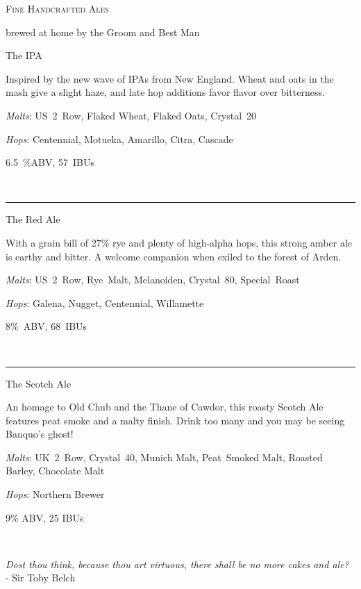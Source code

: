 \documentclass[12pt]{article}
\newcommand{\setbrew}[5]{
\begin{minipage}[t]{0.30\textwidth}
\begin{center}
  {\huge #1}

\medskip
  
{\large #2

  \medskip

  \textit{Malts}: #3
  
  \smallskip
  
  \textit{Hops}: #4
  
  \medskip
  
  #5
}\ 
\end{center}
\end{minipage}
}
\newcommand{\brewrule}{
  \hspace*{\fill} \rule[-8.5cm]{1pt}{9.25cm} \hspace*{\fill}
}
\begin{document}
\begin{center}

{\Huge \scshape Fine Handcrafted Ales }

\bigskip

{\Large brewed at home by the Groom and Best Man}

\vspace*{\fill}

\setbrew{The IPA}
{
Inspired by the new wave of IPAs from New England.  Wheat and oats in
the mash give a slight haze, and late hop additions favor flavor over
bitterness.
}
{US~2~Row, Flaked Wheat, Flaked Oats, Crystal~20}
{Centennial, Motueka, Amarillo, Citra, Cascade}
{6.5~\%ABV, 57~IBUs}
%
\brewrule
\setbrew{The Red Ale}
{
  With a grain bill of 27\% rye and plenty of high-alpha hops, this strong
  amber ale is earthy and bitter.
  A welcome companion when exiled to the forest of Arden.
}
{ US~2~Row, Rye~Malt, Melanoiden, Crystal~80, Special~Roast }
{ Galena, Nugget, Centennial, Willamette }
{ 8\%~ABV, 68~IBUs }
%
\brewrule
\setbrew{The Scotch Ale}
{
  An homage to Old Chub and the Thane of Cawdor, this roasty 
  Scotch Ale features peat smoke and a malty finish.
  Drink too many and you may be seeing Banquo's ghost!
}
{ UK~2~Row, Crystal~40, Munich Malt, Peat~Smoked Malt, Roasted
  Barley, Chocolate Malt
}
{ Northern Brewer }
{ 9\% ABV, 25 IBUs }

\vspace*{\fill}

{\large
\textit{Dost thou think, because thou art 
  virtuous, there shall be no more cakes and ale?} \\
- Sir Toby Belch
}

\vspace*{\fill}

\end{center}
\end{document}
